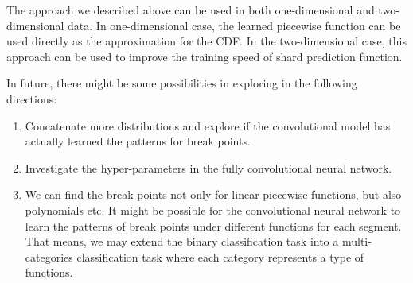 The approach we described above can be used in both one-dimensional and two-dimensional data. In one-dimensional case, the learned piecewise function can be used directly as the approximation for the CDF. In the two-dimensional case, this approach can be used to improve the training speed of shard prediction function.

In future, there might be some possibilities in exploring in the following directions:

\begin{enumerate}
	\item Concatenate more distributions and explore if the convolutional model has actually learned the patterns for break points.
	\item Investigate the hyper-parameters in the fully convolutional neural network.
	\item We can find the break points not only for linear piecewise functions, but also polynomials etc. It might be possible for the convolutional neural network to learn the patterns of break points under different functions for each segment. That means, we may extend the binary classification task into a multi-categories classification task where each category represents a type of functions.
\end{enumerate}






































